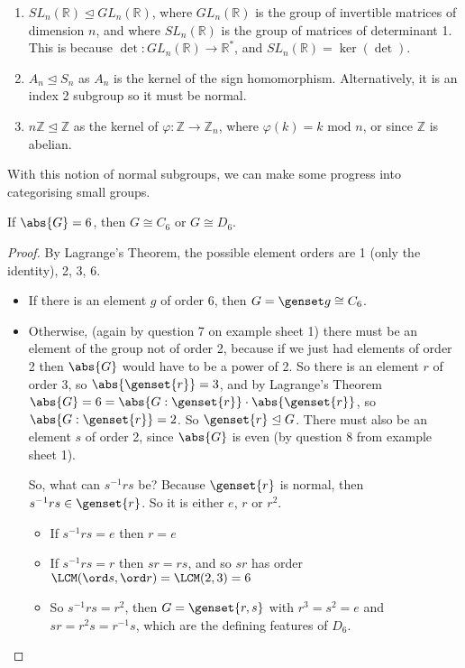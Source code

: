 \begin{enumerate}
	\item \(SL_n(\mathbb R) \trianglelefteq GL_n(\mathbb R)\), where \(GL_n(\mathbb R)\) is the group of invertible matrices of dimension \(n\), and where \(SL_n(\mathbb R)\) is the group of matrices of determinant 1.
	      This is because \(\det: GL_n(\mathbb R) \to \mathbb R^*\), and \(SL_n(\mathbb R) = \ker (\det)\).
	\item \(A_n \trianglelefteq S_n\) as \(A_n\) is the kernel of the sign homomorphism.
	      Alternatively, it is an index 2 subgroup so it must be normal.
	\item \(n\mathbb Z \trianglelefteq \mathbb Z\) as the kernel of \(\varphi: \mathbb Z \to \mathbb Z_n\), where \(\varphi(k) = k \text{ mod } n\), or since \(\mathbb Z\) is abelian.
\end{enumerate}
With this notion of normal subgroups, we can make some progress into categorising small groups.
\begin{proposition}
	If \(\abs{G} = 6\), then \(G \cong C_6\) or \(G \cong D_6\).
\end{proposition}
\begin{proof}
	By Lagrange's Theorem, the possible element orders are 1 (only the identity), 2, 3, 6.
	\begin{itemize}
		\item If there is an element \(g\) of order 6, then \(G = \genset g \cong C_6\).
		\item Otherwise, (again by question 7 on example sheet 1) there must be an element of the group not of order 2, because if we just had elements of order 2 then \(\abs{G}\)
		      would have to be a power of 2.
		      So there is an element \(r\) of order 3, so \(\abs{\genset{r}} = 3\), and by Lagrange's Theorem \(\abs{G} = 6 = \abs{G:\genset{r}} \cdot \abs{\genset{r}}\), so \(\abs{G:\genset{r}} = 2\).
		      So \(\genset{r} \trianglelefteq G\).
		      There must also be an element \(s\) of order 2, since \(\abs{G}\) is even (by question 8 from example sheet 1).

		      So, what can \(s^{-1} r s\) be?
		      Because \(\genset{r}\) is normal, then \(s^{-1} r s \in \genset{r}\).
		      So it is either \(e\), \(r\) or \(r^2\).
		      \begin{itemize}
			      \item If \(s^{-1}rs = e\) then \(r = e\) \contradiction{}
			      \item If \(s^{-1}rs = r\) then \(sr=rs\), and so \(sr\) has order \(\LCM(\ord s, \ord r) = \LCM(2, 3) = 6\) \contradiction{}
			      \item So \(s^{-1}rs = r^2\), then \(G = \genset{r, s}\) with \(r^3 = s^2 = e\) and \(sr = r^2 s = r^{-1}s\), which are the defining features of \(D_6\).
		      \end{itemize}
	\end{itemize}
\end{proof}

